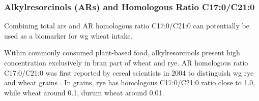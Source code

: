 \subsubsection{Alkylresorcinols (ARs) and Homologous Ratio C17:0/C21:0}
Combining total \acrfull{ars} and AR homologous ratio C17:0/C21:0 can potentially be used as a biomarker for \acrshort{wg} wheat intake.


Within commonly consumed plant-based food, alkylresorcinols present high concentration exclusively in bran part of wheat and rye. AR homologous ratio C17:0/C21:0 was first reported by cereal scientists in 2004 to distinguish \acrshort{wg} rye and wheat grains \cite{Chen2004}. In grains, rye has homologous C17:0/C21:0 ratio close to 1.0, while wheat around 0.1, durum wheat around 0.01.

